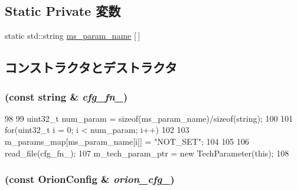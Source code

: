 \subsection*{Static Private 変数}
\begin{DoxyCompactItemize}
\item 
static std::string \hyperlink{classOrionConfig_a7353196d3b69ba80198b70a8906fb809}{ms\_\-param\_\-name} \mbox{[}$\,$\mbox{]}
\end{DoxyCompactItemize}


\subsection{コンストラクタとデストラクタ}
\hypertarget{classOrionConfig_a560f69ec2a5fd4c70a8c6f0e9bf6c2bf}{
\subsubsection[{OrionConfig}]{ (const string \& {\em cfg\_\-fn\_\-})}}
\label{classOrionConfig_a560f69ec2a5fd4c70a8c6f0e9bf6c2bf}



\begin{DoxyCode}
98 {
99     uint32_t num_param = sizeof(ms_param_name)/sizeof(string);
100 
101     for(uint32_t i = 0; i < num_param; i++)
102     {
103         m_params_map[ms_param_name[i]] = "NOT_SET";
104     }
105 
106     read_file(cfg_fn_);
107     m_tech_param_ptr = new TechParameter(this);
108 }
\end{DoxyCode}
\hypertarget{classOrionConfig_a5d07618aac0d14ca386ce86fb8c40889}{
\subsubsection[{OrionConfig}]{ (const {\bf OrionConfig} \& {\em orion\_\-cfg\_\-})}}
\label{classOrionConfig_a5d07618aac0d14ca386ce86fb8c40889}



